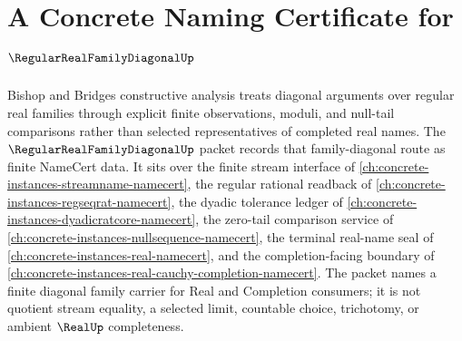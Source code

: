 \chapter{A Concrete Naming Certificate for $\RegularRealFamilyDiagonalUp$}
\label{ch:concrete-instances-regular-real-family-diagonal-namecert}

Bishop and Bridges constructive analysis treats diagonal arguments over regular real families through explicit finite observations, moduli, and null-tail comparisons rather than selected representatives of completed real names. The $\RegularRealFamilyDiagonalUp$ packet records that family-diagonal route as finite NameCert data. It sits over the finite stream interface of \autoref{ch:concrete-instances-streamname-namecert}, the regular rational readback of \autoref{ch:concrete-instances-regseqrat-namecert}, the dyadic tolerance ledger of \autoref{ch:concrete-instances-dyadicratcore-namecert}, the zero-tail comparison service of \autoref{ch:concrete-instances-nullsequence-namecert}, the terminal real-name seal of \autoref{ch:concrete-instances-real-namecert}, and the completion-facing boundary of \autoref{ch:concrete-instances-real-cauchy-completion-namecert}. The packet names a finite diagonal family carrier for Real and Completion consumers; it is not quotient stream equality, a selected limit, countable choice, trichotomy, or ambient $\RealUp$ completeness.

